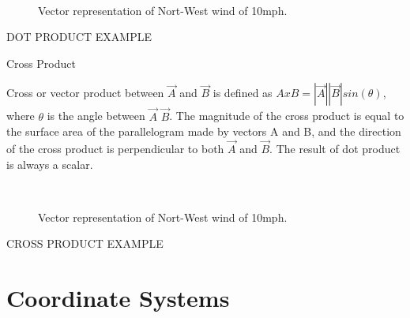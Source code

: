 \begin{description}
\begin{figure}[htbp]
\begin{center}
\strut{} \\
\end{center}
\caption{Vector representation of Nort-West wind of 10mph.}
\label{wind}
\end{figure}

DOT PRODUCT EXAMPLE

\item{Cross Product}

Cross or vector product between  $\vec{A}$ and $\vec{B}$ is defined as $A x B = |\vec{A}| |\vec{B}| sin(\theta)$, where $\theta$ is the angle between $\vec{A}$ $\vec{B}$. The magnitude of the cross product is equal to the surface area of the parallelogram made by vectors A and B, and the direction of the cross product is perpendicular to both $\vec{A}$ and $\vec{B}$. The result of dot product is always a scalar.


\begin{figure}[htbp]
\begin{center}
\strut{} \\
\end{center}
\caption{Vector representation of Nort-West wind of 10mph.}
\label{wind}
\end{figure}

CROSS PRODUCT EXAMPLE 

\end{description}

\section{Coordinate Systems}

